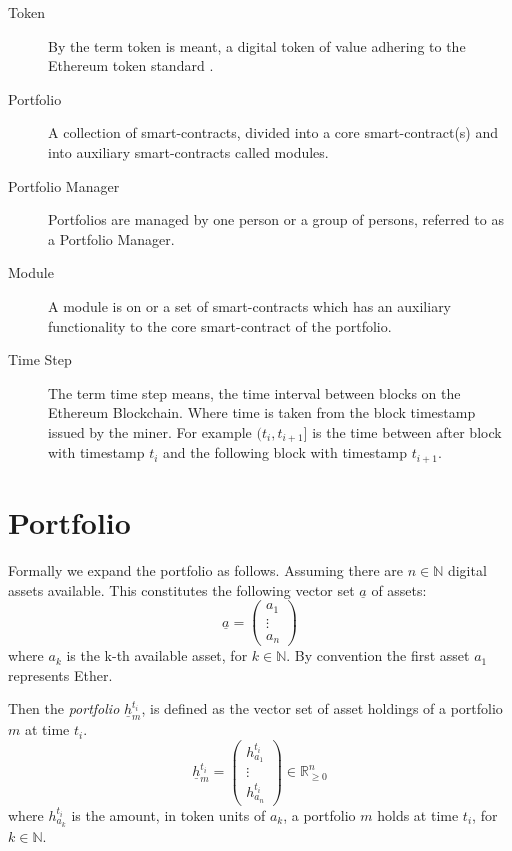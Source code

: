 \documentclass[9pt,oneside]{amsart}
\theoremstyle{plain}
\begin{document}
\begin{description}
\item[Token] By the term token is meant, a digital token of value adhering to the Ethereum token standard \cite{tokenstandard}.
\item[Portfolio] A collection of smart-contracts, divided into a core smart-contract(s) and into auxiliary smart-contracts called modules.
\item[Portfolio Manager] Portfolios are managed by one person or a group of persons, referred to as a Portfolio Manager.
\item[Module] A module is on or a set of smart-contracts which has an auxiliary functionality to the core smart-contract of the portfolio.
\item[Time Step] The term time step means, the time interval between blocks on the Ethereum Blockchain. Where time is taken from the block timestamp issued by the miner. For example $(t_i, t_{i+1}]$ is the time between after block with timestamp $t_i$ and the following block with timestamp $t_{i+1}$.
	
\end{description}

\section{Portfolio}\label{app:defportfolio}

Formally we expand the portfolio as follows. Assuming there are $n \in \mathbb{N}$ digital assets available. This constitutes the following vector set $\underline{a}$ of assets:
\begin{equation}
	\underline{a} = \begin{pmatrix}a_{1}\\ \vdots \\ a_{n}\end{pmatrix}
\end{equation}
where $a_k$ is the k-th available asset, for $k \in \mathbb{N}$.
By convention the first asset $a_1$ represents Ether.

Then the \textit{portfolio} $\underline{h}_m^{t_i}$, is defined as the vector set of asset holdings of a portfolio $m$ at time $t_i$.
\begin{equation}
	\underline{h}_m^{t_i} = \begin{pmatrix}h_{a_{1}}^{t_i}\\ \vdots \\ h_{a_{n}}^{t_i}\end{pmatrix} \in \mathbb{R}_{\geq 0}^n
\end{equation}
where $h_{a_{k}}^{t_i}$ is the amount, in token units of $a_k$, a portfolio $m$ holds at time $t_i$, for $k \in \mathbb{N}$.
\end{document}
